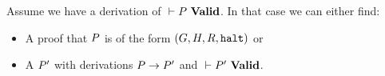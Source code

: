 \begin{theorem}
  Assume we have a derivation of ${} |- {P}\ \mathbf{Valid}$. In that case we can either
  find:
  \begin{itemize}
  \item A proof that $P$ is of the form
    $(G, H, R, \mathtt{halt})$ or
  \item A $P'$ with derivations ${P} -> {P'}$ and ${} |- {P'}\ \mathbf{Valid}$.
  \end{itemize}
\end{theorem}
